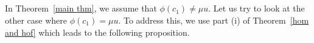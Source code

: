 \documentclass{amsart}
\newcommand{\thmref}[1]{Theorem~\ref{#1}}
\begin{document}
	
	
	\subsection{} In \thmref{main thm}, we assume that $\phi(c_1) \neq \mu u$. Let us try to look at the other case where $\phi(c_1) = \mu u$. To address this, we %
use part (i) of \thmref{hom and hof} which %
leads %
to the following proposition.
	
\end{document}
